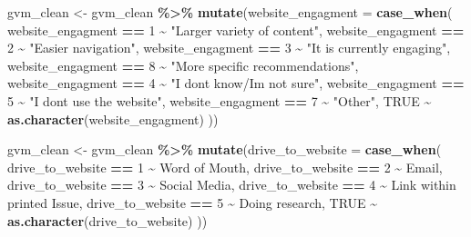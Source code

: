 \documentclass[
]{article}
\newenvironment{Shaded}{\begin{snugshade}}{\end{snugshade}}
\newcommand{\AttributeTok}[1]{\textcolor[rgb]{0.13,0.29,0.53}{#1}}
\newcommand{\ConstantTok}[1]{\textcolor[rgb]{0.56,0.35,0.01}{#1}}
\newcommand{\FunctionTok}[1]{\textcolor[rgb]{0.13,0.29,0.53}{\textbf{#1}}}
\newcommand{\NormalTok}[1]{#1}
\newcommand{\OtherTok}[1]{\textcolor[rgb]{0.56,0.35,0.01}{#1}}
\newcommand{\SpecialCharTok}[1]{\textcolor[rgb]{0.81,0.36,0.00}{\textbf{#1}}}
\newcommand{\StringTok}[1]{\textcolor[rgb]{0.31,0.60,0.02}{#1}}
\begin{document}
\begin{Shaded}
\begin{Highlighting}[]
\NormalTok{gvm\_clean }\OtherTok{\textless{}{-}}\NormalTok{ gvm\_clean }\SpecialCharTok{\%\textgreater{}\%}
  \FunctionTok{mutate}\NormalTok{(}\AttributeTok{website\_engagment =} \FunctionTok{case\_when}\NormalTok{(}
\NormalTok{    website\_engagment }\SpecialCharTok{==} \StringTok{\textquotesingle{}1\textquotesingle{}} \SpecialCharTok{\textasciitilde{}} \StringTok{"Larger variety of content"}\NormalTok{,}
\NormalTok{    website\_engagment }\SpecialCharTok{==} \StringTok{\textquotesingle{}2\textquotesingle{}} \SpecialCharTok{\textasciitilde{}} \StringTok{"Easier navigation"}\NormalTok{,}
\NormalTok{    website\_engagment }\SpecialCharTok{==} \StringTok{\textquotesingle{}3\textquotesingle{}} \SpecialCharTok{\textasciitilde{}} \StringTok{"It is currently engaging"}\NormalTok{,}
\NormalTok{    website\_engagment }\SpecialCharTok{==} \StringTok{\textquotesingle{}8\textquotesingle{}} \SpecialCharTok{\textasciitilde{}} \StringTok{"More specific recommendations"}\NormalTok{,}
\NormalTok{    website\_engagment }\SpecialCharTok{==} \StringTok{\textquotesingle{}4\textquotesingle{}} \SpecialCharTok{\textasciitilde{}} \StringTok{"I don\textquotesingle{}t know/I\textquotesingle{}m not sure"}\NormalTok{,}
\NormalTok{    website\_engagment }\SpecialCharTok{==} \StringTok{\textquotesingle{}5\textquotesingle{}} \SpecialCharTok{\textasciitilde{}} \StringTok{"I don\textquotesingle{}t use the website"}\NormalTok{,}
\NormalTok{    website\_engagment }\SpecialCharTok{==} \StringTok{\textquotesingle{}7\textquotesingle{}} \SpecialCharTok{\textasciitilde{}} \StringTok{"Other"}\NormalTok{,}
    \ConstantTok{TRUE} \SpecialCharTok{\textasciitilde{}} \FunctionTok{as.character}\NormalTok{(website\_engagment)}
\NormalTok{  ))}


\NormalTok{gvm\_clean }\OtherTok{\textless{}{-}}\NormalTok{ gvm\_clean }\SpecialCharTok{\%\textgreater{}\%}
  \FunctionTok{mutate}\NormalTok{(}\AttributeTok{drive\_to\_website =} \FunctionTok{case\_when}\NormalTok{(}
\NormalTok{    drive\_to\_website }\SpecialCharTok{==} \StringTok{\textquotesingle{}1\textquotesingle{}} \SpecialCharTok{\textasciitilde{}} \StringTok{\textquotesingle{}Word of Mouth\textquotesingle{}}\NormalTok{,}
\NormalTok{    drive\_to\_website }\SpecialCharTok{==} \StringTok{\textquotesingle{}2\textquotesingle{}} \SpecialCharTok{\textasciitilde{}} \StringTok{\textquotesingle{}Email\textquotesingle{}}\NormalTok{,}
\NormalTok{    drive\_to\_website }\SpecialCharTok{==} \StringTok{\textquotesingle{}3\textquotesingle{}} \SpecialCharTok{\textasciitilde{}} \StringTok{\textquotesingle{}Social Media\textquotesingle{}}\NormalTok{,}
\NormalTok{    drive\_to\_website }\SpecialCharTok{==} \StringTok{\textquotesingle{}4\textquotesingle{}} \SpecialCharTok{\textasciitilde{}} \StringTok{\textquotesingle{}Link within printed Issue\textquotesingle{}}\NormalTok{,}
\NormalTok{    drive\_to\_website }\SpecialCharTok{==} \StringTok{\textquotesingle{}5\textquotesingle{}} \SpecialCharTok{\textasciitilde{}} \StringTok{\textquotesingle{}Doing research\textquotesingle{}}\NormalTok{,}
    \ConstantTok{TRUE} \SpecialCharTok{\textasciitilde{}} \FunctionTok{as.character}\NormalTok{(drive\_to\_website)}
\NormalTok{  ))}


\end{Highlighting}
\end{Shaded}
\end{document}
